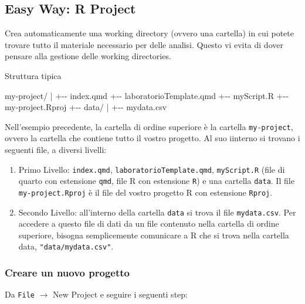 \documentclass[
  a4paper,
  DIV=11,
  numbers=noendperiod]{scrreprt}
\newenvironment{Shaded}{\begin{snugshade}}{\end{snugshade}}
\newcommand{\NormalTok}[1]{#1}
\providecommand{\tightlist}{%
  \setlength{\itemsep}{0pt}\setlength{\parskip}{0pt}}
\begin{document}
\subsection{Easy Way: R Project}\label{sec-project}

Crea automaticamente una working directory (ovvero una cartella) in cui
potete trovare tutto il materiale necessario per delle analisi. Questo
vi evita di dover pensare alla gestione delle working directories.

Struttura tipica

\begin{Shaded}
\begin{Highlighting}[]
\NormalTok{my{-}project/}
\NormalTok{|}
\NormalTok{+{-}{-} index.qmd}
\NormalTok{+{-}{-} laboratorioTemplate.qmd}
\NormalTok{+{-}{-} myScript.R}
\NormalTok{+{-}{-} my{-}project.Rproj}
\NormalTok{+{-}{-} data/}
\NormalTok{|   +{-}{-} mydata.csv}
\end{Highlighting}
\end{Shaded}

Nell'esempio precedente, la cartella di ordine superiore è la cartella
\texttt{my-project}, ovvero la cartella che contiene tutto il vostro
progetto. Al suo iinterno si trovano i seguenti file, a diversi livelli:

\begin{enumerate}
\def\labelenumi{\arabic{enumi}.}
\tightlist
\item
  Primo Livello: \texttt{index.qmd}, \texttt{laboratorioTemplate.qmd},
  \texttt{myScript.R} (file di quarto con estensione \texttt{qmd}, file
  R con estensione \texttt{R}) e una cartella \texttt{data}. Il file
  \texttt{my-project.Rproj} è il file del vostro progetto R con
  estensione \texttt{Rproj}.
\item
  Secondo Livello: all'interno della cartella \texttt{data} si trova il
  file \texttt{mydata.csv}. Per accedere a questo file di dati da un
  file contenuto nella cartella di ordine superiore, bisogna
  semplicemente comunicare a R che si trova nella cartella data,
  \texttt{"data/mydata.csv"}.
\end{enumerate}

\subsubsection{Creare un nuovo progetto}\label{creare-un-nuovo-progetto}

Da \texttt{File} \(\rightarrow\) New Project e seguire i seguenti step:
\end{document}
